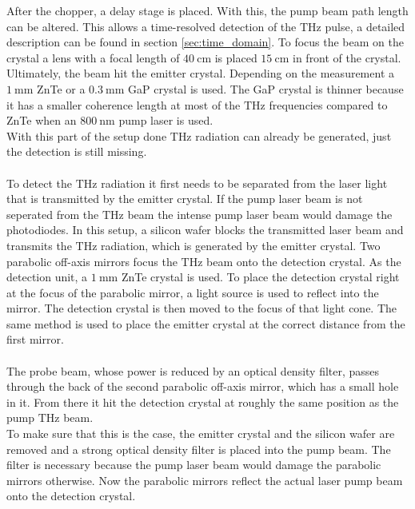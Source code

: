 After the chopper, a delay stage is placed.
With this, the pump beam path length can be altered.
This allows a time-resolved detection of the $\si{\tera\hertz}$ pulse, a detailed description can be found in section \ref{sec:time_domain}.
To focus the beam on the crystal a lens with a focal length of $\SI{40}{\centi\meter}$ is placed $\SI{15}{\centi\meter}$ in front of the crystal.
Ultimately, the beam hit the emitter crystal.
Depending on the measurement a $\SI{1}{\milli\meter}$ ZnTe or a $\SI{0.3}{\milli\meter}$ GaP crystal is used.
The GaP crystal is thinner because it has a smaller coherence length at most of the $\si{\tera\hertz}$ frequencies compared to ZnTe when an $\SI{800}{\nano\meter}$ pump laser is used.
\\
With this part of the setup done $\si{\tera\hertz}$ radiation can already be generated, just the detection is still missing.
\\\\
To detect the $\si{\tera\hertz}$ radiation it first needs to be separated from the laser light that is transmitted by the emitter crystal.
If the pump laser beam is not seperated from the $\si{\tera\hertz}$ beam the intense pump laser beam would damage the photodiodes.
In this setup, a silicon wafer blocks the transmitted laser beam and transmits the $\si{\tera\hertz}$ radiation, which is generated by the emitter crystal.
Two parabolic off-axis mirrors focus the $\si{\tera\hertz}$ beam onto the detection crystal.
As the detection unit, a $\SI{1}{\milli\meter}$ ZnTe crystal is used.
To place the detection crystal right at the focus of the parabolic mirror, a light source is used to reflect into the mirror.
The detection crystal is then moved to the focus of that light cone.
The same method is used to place the emitter crystal at the correct distance from the first mirror.
\\\\
The probe beam, whose power is reduced by an optical density filter, passes through the back of the second parabolic off-axis mirror, which has a small hole in it.
From there it hit the detection crystal at roughly the same position as the pump $\si{\tera\hertz}$ beam.
\\
To make sure that this is the case, the emitter crystal and the silicon wafer are removed and a strong optical density filter is placed into the pump beam.
The filter is necessary because the pump laser beam would damage the parabolic mirrors otherwise.
Now the parabolic mirrors reflect the actual laser pump beam onto the detection crystal.
